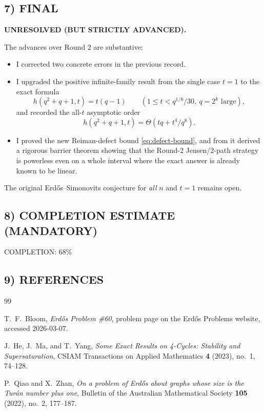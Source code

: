 \subsection*{7) FINAL}
\textbf{UNRESOLVED (BUT STRICTLY ADVANCED).}

The advances over Round 2 are substantive:
\begin{itemize}
\item I corrected two concrete errors in the previous record.
\item I upgraded the positive infinite-family result from the single case $t=1$ to the exact formula
\[
h(q^2+q+1,t)=t(q-1)\qquad (1\le t<q^{1/8}/30,\ q=2^k\text{ large}),
\]
and recorded the all-$t$ asymptotic order
\[
h(q^2+q+1,t)=\Theta(tq+t^4/q^8).
\]
\item I proved the new Reiman-defect bound \eqref{eq:defect-bound}, and from it derived a rigorous barrier theorem showing that the Round-2 Jensen/$2$-path strategy is powerless even on a whole interval where the exact answer is already known to be linear.
\end{itemize}

The original Erd\H{o}s--Simonovits conjecture for \emph{all} $n$ and $t=1$ remains open.

\subsection*{8) COMPLETION ESTIMATE (MANDATORY)}
COMPLETION: 68\%

\subsection*{9) REFERENCES}
\begin{thebibliography}{99}

T.~F.~Bloom,
\emph{Erd\H{o}s Problem \#60},
problem page on the Erd\H{o}s Problems website, accessed 2026-03-07.

J.~He, J.~Ma, and T.~Yang,
\emph{Some Exact Results on 4-Cycles: Stability and Supersaturation},
CSIAM Transactions on Applied Mathematics \textbf{4} (2023), no.~1, 74--128.

P.~Qiao and X.~Zhan,
\emph{On a problem of Erd\H{o}s about graphs whose size is the Tur\'an number plus one},
Bulletin of the Australian Mathematical Society \textbf{105} (2022), no.~2, 177--187.

\end{thebibliography}
